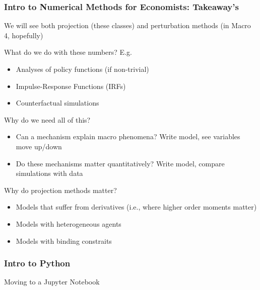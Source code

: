 \documentclass[10pt, aspectratio=1610]{beamer}
\begin{document}
  \begin{frame}
    \frametitle{Intro to Numerical Methods for Economists: Takeaway's}

    We will see both projection (these classes) and perturbation methods (in Macro 4, hopefully)

    \vfill\pause

    What do we do with these numbers? E.g.
    \begin{itemize}
      \item Analyses of policy functions (if non-trivial)
      \item Impulse-Response Functions (IRFs)
      \item Counterfactual simulations
    \end{itemize}

    \vfill\pause

    Why do we need all of this?
    \begin{itemize}
      \item Can a mechanism explain macro phenomena? Write model, see variables move up/down
      \item Do these mechanisms matter quantitatively? Write model, compare simulations with data
    \end{itemize}

    \vfill\pause

    Why do projection methods matter?
    \begin{itemize}
      \item Models that suffer from derivatives (i.e., where higher order moments matter)
      \item Models with heterogeneous agents
      \item Models with binding constraits
    \end{itemize}

  \end{frame}

  \begin{frame}
    \frametitle{Intro to Python}

    Moving to a Jupyter Notebook

  \end{frame}
\end{document}
